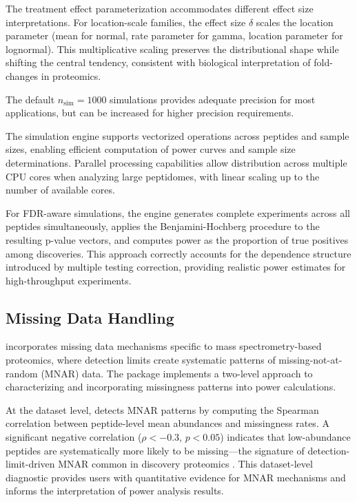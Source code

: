 \documentclass[article]{jss}
\begin{document}
The treatment effect parameterization accommodates different effect size interpretations. For location-scale families, the effect size $\delta$ scales the location parameter (mean for normal, rate parameter for gamma, location parameter for lognormal). This multiplicative scaling preserves the distributional shape while shifting the central tendency, consistent with biological interpretation of fold-changes in proteomics.

The default $n_{\text{sim}} = 1000$ simulations provides adequate precision for most applications, but can be increased for higher precision requirements.

The simulation engine supports vectorized operations across peptides and sample sizes, enabling efficient computation of power curves and sample size determinations. Parallel processing capabilities allow distribution across multiple CPU cores when analyzing large peptidomes, with linear scaling up to the number of available cores.

For FDR-aware simulations, the engine generates complete experiments across all peptides simultaneously, applies the Benjamini-Hochberg procedure to the resulting p-value vectors, and computes power as the proportion of true positives among discoveries. This approach correctly accounts for the dependence structure introduced by multiple testing correction, providing realistic power estimates for high-throughput experiments.

\subsection{Missing Data Handling}

 incorporates missing data mechanisms specific to mass spectrometry-based proteomics, where detection limits create systematic patterns of missing-not-at-random (MNAR) data. The package implements a two-level approach to characterizing and incorporating missingness patterns into power calculations.

At the dataset level,  detects MNAR patterns by computing the Spearman correlation between peptide-level mean abundances and missingness rates. A significant negative correlation ($\rho < -0.3$, $p < 0.05$) indicates that low-abundance peptides are systematically more likely to be missing---the signature of detection-limit-driven MNAR common in discovery proteomics \citep{webb2015mnar}. This dataset-level diagnostic provides users with quantitative evidence for MNAR mechanisms and informs the interpretation of power analysis results.
\end{document}

